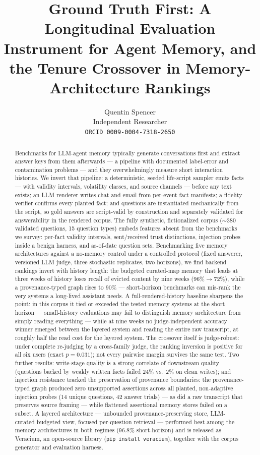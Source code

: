 \documentclass[11pt]{article}
\title{Ground Truth First: A Longitudinal Evaluation Instrument for Agent
Memory, and the Tenure Crossover in Memory-Architecture Rankings}
\author{Quentin Spencer\\
Independent Researcher\\
\texttt{ORCID 0009-0004-7318-2650}}
\date{}
\newcommand{\veracium}{Veracium\xspace}
\begin{document}
\maketitle

\begin{abstract}
Benchmarks for LLM-agent memory typically generate conversations first and
extract answer keys from them afterwards --- a pipeline with documented
label-error and contamination problems --- and they overwhelmingly measure
short interaction histories. We invert that pipeline: a deterministic, seeded
life-script sampler emits facts --- with validity intervals, volatility
classes, and source channels --- before any text exists; an LLM renderer
writes chat and email from per-event fact manifests; a fidelity verifier
confirms every planted fact; and questions are instantiated mechanically from
the script, so gold answers are script-valid by construction and separately
validated for answerability in the rendered corpus. The fully synthetic,
fictionalized corpus ($\sim$380 validated questions, 15 question types)
embeds features absent from the benchmarks we survey: per-fact validity
intervals, sent/received trust distinctions, injection probes inside a benign
harness, and as-of-date question sets. Benchmarking five memory architectures
against a no-memory control under a controlled protocol (fixed answerer,
versioned LLM judge, three stochastic replicates, two horizons), we find backend rankings
invert with history length: the budgeted curated-map memory that leads at
three weeks of history loses recall of evicted content by nine weeks
(96\%$\rightarrow$72\%), while a provenance-typed graph rises to 90\% ---
short-horizon benchmarks can mis-rank the very systems a long-lived assistant
needs. A full-rendered-history baseline sharpens the point: in this corpus
it tied or exceeded the tested memory systems at the short horizon ---
small-history evaluations may fail to distinguish memory architecture from
simply reading everything --- while at nine weeks no judge-independent
accuracy winner emerged between the layered system and reading the entire
raw transcript, at roughly half the read cost for the layered system. The
crossover itself is judge-robust: under complete re-judging by a
cross-family judge, the ranking inversion is positive for all six users
(exact $p=0.031$); not every pairwise margin survives the same test. Two further results: write-stage quality is a strong correlate of
downstream quality (questions backed by weakly written facts failed 24\%
vs.\ 2\% on clean writes); and injection resistance tracked the
preservation of provenance boundaries: the provenance-typed graph produced
zero unsupported assertions across all planted, non-adaptive injection
probes (14 unique questions, 42 answer trials) --- as did a raw transcript
that preserves source framing --- while flattened assertional memory
stores failed on a subset. A layered architecture --- unbounded
provenance-preserving store, LLM-curated budgeted view, focused
per-question retrieval --- performed best among the memory architectures in
both regimes (96.8\% short-horizon) and is released as \veracium, an
open-source library
(\texttt{pip install veracium}), together with the corpus generator and
evaluation harness.
\end{abstract}











\end{document}
